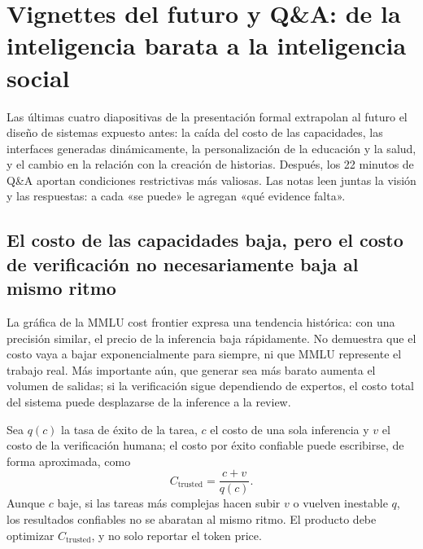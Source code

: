 \section{Vignettes del futuro y Q\&A: de la inteligencia barata a la inteligencia social}

Las últimas cuatro diapositivas de la presentación formal extrapolan al futuro el diseño de sistemas expuesto antes: la caída del costo de las capacidades, las interfaces generadas dinámicamente, la personalización de la educación y la salud, y el cambio en la relación con la creación de historias. Después, los 22 minutos de Q\&A aportan condiciones restrictivas más valiosas. Las notas leen juntas la visión y las respuestas: a cada «se puede» le agregan «qué evidence falta».

\subsection{El costo de las capacidades baja, pero el costo de verificación no necesariamente baja al mismo ritmo}

La gráfica de la MMLU cost frontier expresa una tendencia histórica: con una precisión similar, el precio de la inferencia baja rápidamente. No demuestra que el costo vaya a bajar exponencialmente para siempre, ni que MMLU represente el trabajo real. Más importante aún, que generar sea más barato aumenta el volumen de salidas; si la verificación sigue dependiendo de expertos, el costo total del sistema puede desplazarse de la inference a la review.


Sea $q(c)$ la tasa de éxito de la tarea, $c$ el costo de una sola inferencia y $v$ el costo de la verificación humana; el costo por éxito confiable puede escribirse, de forma aproximada, como
\[
C_{\text{trusted}}=\frac{c+v}{q(c)}.
\]
Aunque $c$ baje, si las tareas más complejas hacen subir $v$ o vuelven inestable $q$, los resultados confiables no se abaratan al mismo ritmo. El producto debe optimizar $C_{\text{trusted}}$, y no solo reportar el token price.


